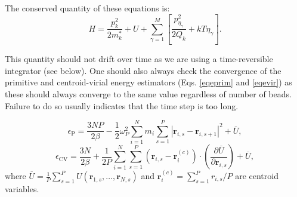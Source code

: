 The conserved quantity of these equations is:
\begin{equation}
H= \frac{p_k^2}{2m_k^*} + U + \sum_{\gamma=1}^M\left[\frac{p^2_{\eta_\gamma}}{2Q_k}+kT\eta_\gamma\right]   .
\end{equation}

This quantity should not drift over time as we are using a time-reversible integrator (see below). One should also always check the convergence of the primitive and centroid-virial energy estimators (Eqs. \ref{eqeprim} and \ref{eqevir}) as these should always converge to the same value regardless of number of beads. Failure to do so usually indicates that the time step is too long.

\begin{equation}
\epsilon_\mathrm{P}=\frac{3NP}{2\beta}-\frac{1}{2}\omega_P^2\sum_{i=1}^N m_i\sum_{s=1}^P |\mathbf{r}_{i,s}-\mathbf{r}_{i,s+1}|^2+\overline{U} ,
\label{eqeprim}
\end{equation}
\begin{equation}
\epsilon_{\mathrm{CV}}=\frac{3N}{2\beta}+\frac{1}{2P}\sum_{i=1}^N\sum_{s=1}^P(\mathbf{r}_{i,s}-\mathbf{r}_i^{(c)})\cdot\left(\frac{\partial \overline{U}}{\partial\mathbf{r}_{i,s}} \right)+\overline{U}  ,
\label{eqevir}
\end{equation}
where $\overline{U}=\frac{1}{P}\sum_{s=1}^P U(\mathbf{r}_{1,s},\dots,\mathbf{r}_{N,s})$ and $\mathbf{r}_i^{(c)}=\sum_{s=1}^Pr_{i,s}/P $ are centroid variables.

